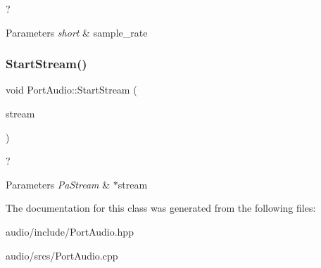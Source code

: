 ? 


\begin{DoxyParams}{Parameters}
{\em short} & sample\+\_\+rate \\
\hline
\end{DoxyParams}
\mbox{\label{class_port_audio_a0da7ed31a1a6e38800c4f4e2e179565f}} 
\subsubsection{\texorpdfstring{Start\+Stream()}{StartStream()}}
{\footnotesize\ttfamily void Port\+Audio\+::\+Start\+Stream (\begin{DoxyParamCaption}\item[{Pa\+Stream $\ast$}]{stream }\end{DoxyParamCaption})}



? 


\begin{DoxyParams}{Parameters}
{\em Pa\+Stream} & $\ast$stream \\
\hline
\end{DoxyParams}


The documentation for this class was generated from the following files\+:\begin{DoxyCompactItemize}
\item 
audio/include/Port\+Audio.\+hpp\item 
audio/srcs/Port\+Audio.\+cpp\end{DoxyCompactItemize}
